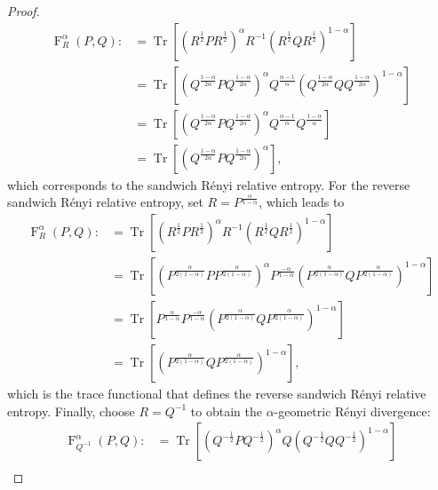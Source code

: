 \documentclass[12pt]{article}
\theoremstyle{definition}
\newcommand{\Fga}[3]{\operatorname{F}_{#3}^\alpha\left(#1, #2\right)}
\begin{document}
\begin{proof}
\begin{equation}
\begin{aligned}
\Fga{P}{Q}{R} :&= \operatorname{Tr} \left[ \left( R^\frac 12 P R^\frac 12 \right)^\alpha R^{-1} \left( R^\frac 12 Q R^\frac 12 \right)^{1-\alpha} \right]\\
&= \operatorname{Tr} \left[ \left( Q^{\frac{1-\alpha}{2\alpha}} P Q^{\frac{1-\alpha}{2\alpha}} \right)^\alpha Q^{\frac{\alpha-1}{\alpha}} \left( Q^{\frac{1-\alpha}{2\alpha}} Q Q^{\frac{1-\alpha}{2\alpha}} \right)^{1-\alpha} \right] \\
&= \operatorname{Tr} \left[ \left( Q^{\frac{1-\alpha}{2\alpha}} P Q^{\frac{1-\alpha}{2\alpha}} \right)^\alpha Q^{\frac{\alpha-1}{\alpha}} Q^{\frac{1-\alpha}{\alpha}} \right] \\
&= \operatorname{Tr} \left[ \left( Q^{\frac{1-\alpha}{2\alpha}} P Q^{\frac{1-\alpha}{2\alpha}} \right)^\alpha \right], 
\end{aligned}
\end{equation}
which corresponds to the sandwich R\'enyi relative entropy. For the reverse sandwich R\'enyi relative entropy, set $R = P^\frac{\alpha}{1-\alpha}$, which leads to
\begin{equation}
\begin{aligned}
    \Fga{P}{Q}{R} :&=   \operatorname{Tr} \left[ \left( R^\frac 12 P R^\frac 12 \right)^\alpha R^{-1} \left( R^\frac 12 Q R^\frac 12 \right)^{1-\alpha} \right] \\
&= \operatorname{Tr} \left[ \left( P^{\frac{\alpha}{2(1-\alpha)}} P P^{\frac{\alpha}{2(1-\alpha)}} \right)^\alpha P^{\frac{-\alpha}{1-\alpha}} \left( P^{\frac{\alpha}{2(1-\alpha)}} Q P^{\frac{\alpha}{2(1-\alpha)}} \right)^{1-\alpha} \right] \\
&= \operatorname{Tr} \left[ P^{\frac{\alpha}{1-\alpha}} P^{\frac{-\alpha}{1-\alpha}} \left( P^{\frac{\alpha}{2(1-\alpha)}} Q P^{\frac{\alpha}{2(1-\alpha)}} \right)^{1-\alpha} \right] \\
&= \operatorname{Tr} \left[ \left( P^{\frac{\alpha}{2(1-\alpha)}} Q P^{\frac{\alpha}{2(1-\alpha)}} \right)^{1-\alpha} \right], 
\end{aligned}
\end{equation}
which is the trace functional that defines the reverse sandwich R\'enyi relative entropy. Finally, choose $R = Q ^{-1} $ to obtain the $\alpha$-geometric R\'enyi divergence:
\begin{equation}
        \begin{aligned}
        \Fga{P}{Q}{Q ^{-1} } :&= \operatorname{Tr} \left[ \left( Q^{-\frac 12} P Q^{-\frac 12} \right)^\alpha Q \left( Q^{-\frac 12} Q Q^{-\frac 12} \right)^{1-\alpha} \right] \\

\end{aligned}
\end{equation}
\end{proof}
\end{document}
